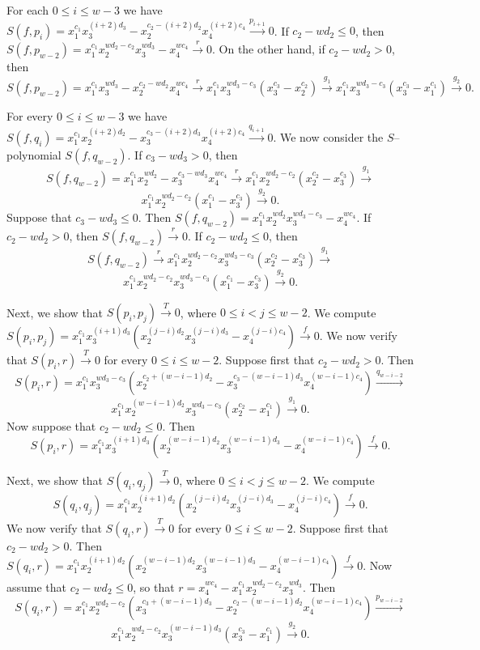 \documentclass[10pt]{amsart}
\begin{document}
For each $0 \leq i \leq w-3$ we have $S(f,p_{i})=x_{1}^{c_1}x_{3}^{(i+2)d_3}-x_{2}^{c_2-(i+2)d_2}x_{4}^{(i+2)c_4} \stackrel{p_{i+1}} {\longrightarrow} 0$. If $c_{2}-wd_{2} \leq 0$, then $S(f,p_{w-2})=x_{1}^{c_1}x_{2}^{wd_{2}-c_{2}}x_{3}^{wd_3}-x_{4}^{wc_4} \stackrel{r} {\longrightarrow} 0$. On the other hand, if $c_{2}-wd_{2}>0$, then $S(f,p_{w-2})=x_{1}^{c_1}x_{3}^{wd_3}-x_{2}^{c_{2}-wd_2}x_4^{wc_4} \stackrel{r} {\longrightarrow} x_1^{c_1}x_3^{wd_3-c_3}(x_{3}^{c_3}-x_{2}^{c_{2}}) \stackrel{g_1} {\longrightarrow} x_1^{c_1}x_3^{wd_3-c_3}(x_{3}^{c_3}-x_{1}^{c_{1}}) \stackrel{g_2} {\longrightarrow} 0.$

For every $0 \leq i \leq w-3$ we have $S(f,q_{i})=x_{1}^{c_1}x_{2}^{(i+2)d_2}-x_{3}^{c_3-(i+2)d_3}x_{4}^{(i+2)c_4} \stackrel{q_{i+1}} {\longrightarrow} 0$. We now consider the $S$--polynomial $S(f,q_{w-2})$. If $c_{3}-wd_{3}>0$, then \[ S(f,q_{w-2})=x_1^{c_1}x_2^{wd_2}-x_3^{c_3-wd_3}x_4^{wc_4}
\stackrel{r}{\longrightarrow}
x_1^{c_1}x_2^{wd_2-c_2}(x_2^{c_2}-x_3^{c_3})
\stackrel{g_1}{\longrightarrow} \] \[
x_1^{c_1}x_2^{wd_2-c_2}(x_1^{c_1}-x_3^{c_3})
\stackrel{g_2}{\longrightarrow}
0.
\]
Suppose that $c_3-wd_3 \leq 0$. Then $S(f,q_{w-2})=x_1^{c_1}x_2^{wd_2}x_3^{wd_3-c_3}-x_4^{wc_4}$. If $c_2-wd_2>0$, then $S(f,q_{w-2})\stackrel{r}{\longrightarrow}0$. If $c_2-wd_2 \leq 0$, then
\[
S(f,q_{w-2})
\stackrel{r}{\longrightarrow}
x_1^{c_1}x_2^{wd_2-c_2}x_3^{wd_3-c_3}(x_2^{c_2}-x_3^{c_3})
\stackrel{g_1}{\longrightarrow} \] \[
x_1^{c_1}x_2^{wd_2-c_2}x_3^{wd_3-c_3}(x_1^{c_1}-x_3^{c_3})
\stackrel{g_2}{\longrightarrow}
0.\]

Next, we show that $S(p_{i},p_{j}) \stackrel{T}{\longrightarrow} 0$, where $0 \leq i<j \leq w-2$. We compute $S(p_{i},p_{j})=x_{1}^{c_1}x_{3}^{(i+1)d_3}(x_{2}^{(j-i)d_{2}}x_{3}^{(j-i)d_{3}}-x_{4}^{(j-i)c_4}) \stackrel{f}{\longrightarrow} 0$. We now verify that $S(p_i,r) \stackrel{T} {\longrightarrow} 0$ for every $0 \leq i \leq w-2$. Suppose first that $c_2-wd_2>0$. Then $$S(p_i,r)=x_{1}^{c_1}x_{3}^{wd_{3}-c_3}(x_{2}^{c_2+(w-i-1)d_{2}}-x_{3}^{c_{3}-(w-i-1)d_{3}}x_{4}^{(w-i-1)c_{4}}) \stackrel{q_{w-i-2}} {\longrightarrow}$$ $$x_{1}^{c_1}x_{2}^{(w-i-1)d_{2}}x_{3}^{wd_{3}-c_3}(x_{2}^{c_2}-x_{1}^{c_{1}}) \stackrel{g_{1}} {\longrightarrow} 0.$$ Now suppose that $c_2-wd_2 \leq 0$. Then $$S(p_i,r)=x_{1}^{c_1}x_{3}^{(i+1)d_3}(x_{2}^{(w-i-1)d_2}x_{3}^{(w-i-1)d_3}-x_{4}^{(w-i-1)c_4}) \stackrel{f} {\longrightarrow} 0.$$

Next, we show that $S(q_{i},q_{j}) \stackrel{T}{\longrightarrow} 0$, where $0 \leq i<j \leq w-2$. We compute $$S(q_{i},q_{j})=x_{1}^{c_1}x_{2}^{(i+1)d_2}(x_{2}^{(j-i)d_{2}}x_{3}^{(j-i)d_{3}}-x_{4}^{(j-i)c_4}) \stackrel{f}{\longrightarrow} 0.$$ We now verify that $S(q_i,r) \stackrel{T} {\longrightarrow} 0$ for every $0 \leq i \leq w-2$. Suppose first that $c_2-wd_2>0$. Then $S(q_i,r)=x_{1}^{c_1}x_{2}^{(i+1)d_2}(x_{2}^{(w-i-1)d_2}x_{3}^{(w-i-1)d_3}-x_{4}^{(w-i-1)c_4}) \stackrel{f} {\longrightarrow}  0$. Now assume that $c_2-wd_2 \leq 0$, so that 
$r=x_4^{wc_4}-x_1^{c_1}x_2^{wd_2-c_2}x_3^{wd_3}$. Then $$S(q_i,r)=x_{1}^{c_1}x_{2}^{wd_{2}-c_2}(x_{3}^{c_3+(w-i-1)d_{3}}-x_{2}^{c_{2}-(w-i-1)d_{2}}x_{4}^{(w-i-1)c_{4}}) \stackrel{p_{w-i-2}} {\longrightarrow}$$ $$x_{1}^{c_1}x_{2}^{wd_{2}-c_2}x_{3}^{(w-i-1)d_{3}}(x_{3}^{c_3}-x_{1}^{c_{1}}) \stackrel{g_{2}} {\longrightarrow} 0.$$
\end{document}
